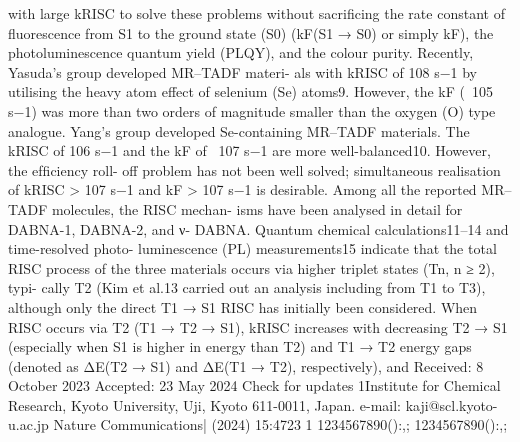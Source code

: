 with large kRISC to solve these problems without sacriﬁcing the rate
constant of ﬂuorescence from S1 to the ground state (S0) (kF(S1 → S0) or
simply kF), the photoluminescence quantum yield (PLQY), and the
colour purity. Recently, Yasuda’s group developed MR–TADF materi-
als with kRISC of 108 s−1 by utilising the heavy atom effect of selenium
(Se) atoms9. However, the kF (~105 s−1) was more than two orders of
magnitude smaller than the oxygen (O) type analogue. Yang’s group
developed Se-containing MR–TADF materials. The kRISC of 106 s−1 and
the kF of ~107 s−1 are more well-balanced10. However, the efﬁciency roll-
off problem has not been well solved; simultaneous realisation of
kRISC > 107 s−1 and kF > 107 s−1 is desirable.
Among all the reported MR–TADF molecules, the RISC mechan-
isms have been analysed in detail for DABNA-1, DABNA-2, and ν-
DABNA. Quantum chemical calculations11–14 and time-resolved photo-
luminescence (PL) measurements15 indicate that the total RISC process
of the three materials occurs via higher triplet states (Tn, n ≥ 2), typi-
cally T2 (Kim et al.13 carried out an analysis including from T1 to T3),
although only the direct T1 → S1 RISC has initially been considered.
When RISC occurs via T2 (T1 → T2 → S1), kRISC increases with decreasing
T2 → S1 (especially when S1 is higher in energy than T2) and T1 → T2
energy gaps (denoted as ΔE(T2 → S1) and ΔE(T1 → T2), respectively), and
Received: 8 October 2023
Accepted: 23 May 2024
Check for updates
1Institute for Chemical Research, Kyoto University, Uji, Kyoto 611-0011, Japan.
e-mail: kaji@scl.kyoto-u.ac.jp
Nature Communications|        (2024) 15:4723 
1
1234567890():,;
1234567890():,;


